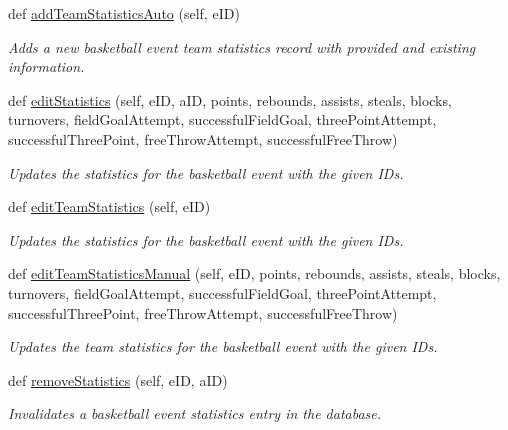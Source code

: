 \begin{DoxyCompactItemize}
def \hyperlink{classhandler_1_1dao_1_1basketball__event__dao_1_1_basketball_event_d_a_o_a08c98e6cc60e289184f65d56bc5f3f14}{add\+Team\+Statistics\+Auto} (self, e\+ID)
\begin{DoxyCompactList}\small\item\em Adds a new basketball event team statistics record with provided and existing information. \end{DoxyCompactList}\item 
def \hyperlink{classhandler_1_1dao_1_1basketball__event__dao_1_1_basketball_event_d_a_o_a4d91c158960117f5f6c089f4674272cd}{edit\+Statistics} (self, e\+ID, a\+ID, points, rebounds, assists, steals, blocks, turnovers, field\+Goal\+Attempt, successful\+Field\+Goal, three\+Point\+Attempt, successful\+Three\+Point, free\+Throw\+Attempt, successful\+Free\+Throw)
\begin{DoxyCompactList}\small\item\em Updates the statistics for the basketball event with the given I\+Ds. \end{DoxyCompactList}\item 
def \hyperlink{classhandler_1_1dao_1_1basketball__event__dao_1_1_basketball_event_d_a_o_a7dceee28749b88466cc112e6baa6a65d}{edit\+Team\+Statistics} (self, e\+ID)
\begin{DoxyCompactList}\small\item\em Updates the statistics for the basketball event with the given I\+Ds. \end{DoxyCompactList}\item 
def \hyperlink{classhandler_1_1dao_1_1basketball__event__dao_1_1_basketball_event_d_a_o_ae4da53a36598f6235bfe799577c41c0d}{edit\+Team\+Statistics\+Manual} (self, e\+ID, points, rebounds, assists, steals, blocks, turnovers, field\+Goal\+Attempt, successful\+Field\+Goal, three\+Point\+Attempt, successful\+Three\+Point, free\+Throw\+Attempt, successful\+Free\+Throw)
\begin{DoxyCompactList}\small\item\em Updates the team statistics for the basketball event with the given I\+Ds. \end{DoxyCompactList}\item 
def \hyperlink{classhandler_1_1dao_1_1basketball__event__dao_1_1_basketball_event_d_a_o_a174587db0a7e34ca1b475f21341a8244}{remove\+Statistics} (self, e\+ID, a\+ID)
\begin{DoxyCompactList}\small\item\em Invalidates a basketball event statistics entry in the database. \end{DoxyCompactList}\item 

\end{DoxyCompactItemize}
